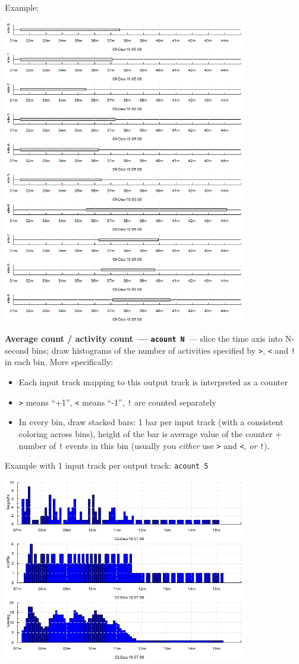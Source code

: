 \documentclass{article}
\begin{document}
Example:

{\centering \includegraphics[width=0.8\textwidth]{pics/tplot/event.png}}

\pagebreak
\noindent
\textbf{Average count / activity count~--- \texttt{acount N}}~--- slice the time axis into N-second bins; draw histograms of the number of activities specified by \texttt{>}, \texttt{<} and \texttt{!} in each bin. More specifically:
\begin{itemize}
 \item Each input track mapping to this output track is interpreted as a counter
 \item \texttt{>} means ``+1'', \texttt{<} means ``-1'', \texttt{!} are counted separately
 \item In every bin, draw stacked bars: 1 bar per input track (with a consistent coloring across bins), height of the bar is average value of the counter + number of \texttt{!} events in this bin (usually you \emph{either} use \texttt{>} and \texttt{<}, \emph{or} \texttt{!}).
\end{itemize}

Example with 1 input track per output track: \texttt{acount 5}

{\centering \includegraphics[width=0.8\textwidth]{pics/tplot/acount-begin-end-running.png}}
\end{document}

